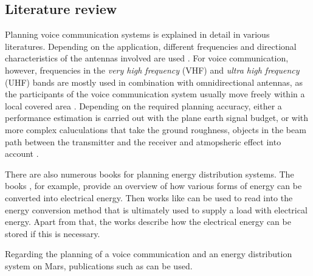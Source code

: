 \subsection{Literature review}
Planning voice communication systems is explained in detail in various literatures. Depending on the application, different frequencies and directional characteristics of the antennas involved are used \cite{Lange:1992, Parsons:2000, Glover:2010, Goiser:2019, Mecklenbrauker:2017}. For voice communication, however, frequencies in the \emph{very high frequency} (VHF) and \emph{ultra high frequency} (UHF) bands are mostly used in combination with omnidirectional antennas, as the participants of the voice communication system usually move freely within a local covered area \cite{Parsons:2000}. Depending on the required planning accuracy, either a performance estimation is carried out with the plane earth signal budget, or with more complex caluculations that take the ground roughness, objects in the beam path between the transmitter and the receiver and atmopsheric effect into account \cite{Parsons:2000, Glover:2010, LinkMargin:2016, Mecklenbrauker:2017}.

There are also numerous books for planning energy distribution systems. The books \cite{Rebhan:2002, Gawlik:2018}, for example, provide an overview of how various forms of energy can be converted into electrical energy. Then works like \cite{Mertens:2015, Hau:2016, Wagner:2018} can be used to read into the energy conversion method that is ultimately used to supply a load with electrical energy. Apart from that, the works \cite{Sterner:2017, Kurzweil:2018} describe how the electrical energy can be stored if this is necessary. 

Regarding the planning of a voice communication and an energy distribution system on Mars, publications such as \cite{Appelbaum:1990, Appelbaum:1992, Landis:1995, Ho:2002} can be used. 


